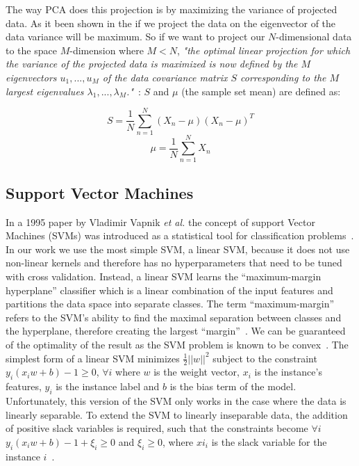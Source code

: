 \documentclass{article} %
\begin{document}
The way PCA does this projection is by maximizing the variance of projected 
data. As it been shown in the \cite{bishop2006pattern} if we project the 
data on the eigenvector of the data variance will be maximum. So if we want 
to project our $N$-dimensional data to the space $M$-dimension where $M<N$, 
\textit{"the optimal linear projection for which the variance of the 
projected data is maximized is now defined by the $M$ eigenvectors 
$u_{1}, ... , u_{M}$ of the data covariance matrix $S$ corresponding to the
$M$ largest eigenvalues $\lambda_{1}, ... ,\lambda_{M}$."}~\cite{bishop2006pattern}: 
$S$ and $\mu$ (the sample set mean) are defined as:

\begin{multicols}{2}
\begin{equation}
S = \frac{1}{N} \sum_{n=1}^{N}(X_{n}-\mu)(X_{n}-\mu)^T
\end{equation}\break
\begin{equation}
\mu = \frac{1}{N} \sum_{n=1}^{N}X_{n}
\end{equation}
\end{multicols}


\subsection{Support Vector Machines}
In a 1995 paper by Vladimir Vapnik \emph{et al.} the concept of support 
Vector Machines (SVMs) was introduced  as a statistical tool for 
classification problems~\cite{shmilovici2005support}. In our work we
use the most simple SVM, a linear SVM, because it does not use non-linear
kernels and therefore has no hyperparameters that need to be tuned
with cross validation. Instead, a linear SVM learns the ``maximum-margin
hyperplane'' classifier which is a linear combination of the input 
features and partitions the data space into separate classes. The term 
``maximum-margin'' refers to the SVM's ability to find the maximal 
separation between classes and the hyperplane, therefore creating the 
largest ``margin''~\cite{shmilovici2005support}. We can be guaranteed of
the optimality of the result as the SVM problem is known to be 
convex~\cite{burges1998tutorial}. The simplest form of a linear SVM 
minimizes $\frac{1}{2}||w||^2$ subject to the constraint 
$y_i (x_i w + b) - 1 \ge 0 $, $\forall i$ where $w$ is the weight vector,
$x_i$ is the instance's features, $y_i$ is the instance label and $b$ is
the bias term of the model. Unfortunately, this version of the SVM only
works in the case where the data is linearly separable. To extend the SVM
to linearly inseparable data, the addition of positive slack variables is
required, such that the constraints become $\forall i$ 
$y_i (x_i w + b) - 1 + \xi_i \ge 0 $ and $\xi_i \ge 0$, where $xi_i$ is 
the slack variable for the instance $i$~\cite{burges1998tutorial}.
\end{document}
